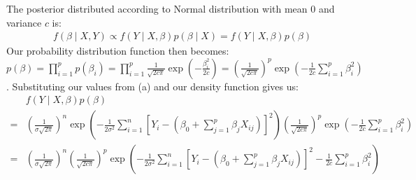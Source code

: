 \documentclass[10pt]{article}
\begin{document}
The posterior distributed according to Normal distribution with mean 0 and variance   $c$ is:
\begin{align*}
    f(\beta \mid X, Y)
    \propto f(Y \mid X, \beta) p(\beta \mid X)
    = f(Y \mid X, \beta) p(\beta)
\end{align*}
\qquad Our probability distribution function then becomes:
$p(\beta)
        = \prod_{i = 1}^{p} p(\beta_i)
        = \prod_{i = 1}^{p}
        \frac{
            1
        }{
            \sqrt{
                2c\pi
            }
        }
        \exp \left(
            - \frac{
                \beta_i^2
                }{
                    2c
                }
        \right)
        = \left(
            \frac{
                1
            }{
                \sqrt{
                    2c\pi
                }
            }
        \right)^p
        \exp \left(
            - \frac{
                1
            }{
                2c
            }
            \sum_{i = 1}^{p} \beta_i^2
        \right)$. Substituting our values from (a) and our density function gives us:
\begin{align*}
    &f(Y \mid X, \beta)p(\beta)\\
   =&
    \left(
        \frac{
            1
        }{
            \sigma \sqrt{2\pi}
        }
    \right)^n
    \exp
    \left(
        - \frac{
            1
        }{
            2\sigma^2
        }
        \sum_{i = 1}^{n}
        \left[
            Y_i - (\beta_0 + \sum_{j = 1}^{p} \beta_j X_{ij})
        \right]^2
    \right)
    \left(
        \frac{
            1
        }{
            \sqrt{
                2c\pi
            }
        }
    \right)^p
    \exp \left(
        - \frac{
            1
        }{
            2c
        }
        \sum_{i = 1}^{p} \beta_i^2
    \right)
    \\
   =&
    \left(
        \frac{
            1
        }{
            \sigma \sqrt{2\pi}
        }
    \right)^n
    \left(
        \frac{
            1
        }{
            \sqrt{
                2c\pi
            }
        }
    \right)^p
    \exp
    \left(
        - \frac{
            1
        }{
            2\sigma^2
        }
        \sum_{i = 1}^{n}
        \left[
            Y_i - (\beta_0 + \sum_{j = 1}^{p} \beta_j X_{ij})
        \right]^2
        - \frac{
            1
        }{
            2c
        }
        \sum_{i = 1}^{p} \beta_i^2
    \right)
\end{align*}
\end{document}
